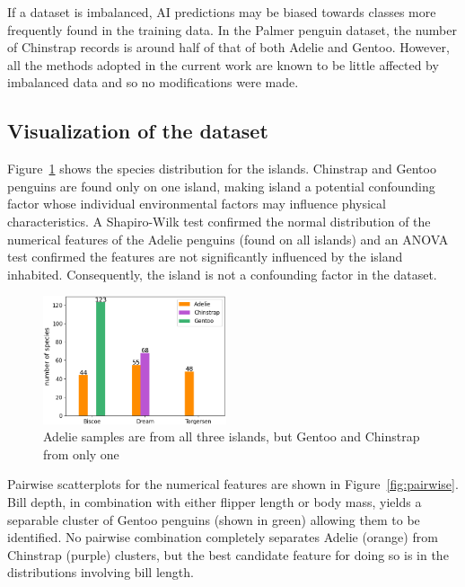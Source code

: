 \documentclass[12pt]{article}
\begin{document}
If a dataset is imbalanced, 
AI predictions may be biased towards classes more frequently found in the training data. 
In the Palmer penguin dataset, the number of Chinstrap records is around half of that of both Adelie and Gentoo.
However, all the methods adopted in the current work are known to be little affected by 
imbalanced data \cite{he2009learning} and so no modifications were made.

\subsection*{Visualization of the dataset}

Figure~\ref{fig:islands} shows the species distribution for the islands. 
Chinstrap and Gentoo penguins are found only on one island, making island a potential confounding factor whose 
individual environmental factors may influence physical characteristics. 
A Shapiro-Wilk test confirmed the normal distribution of the numerical features of the Adelie penguins (found on 
all islands) and an ANOVA test confirmed the features are not significantly influenced by the island inhabited. 
Consequently, the island is not a confounding factor in the dataset.

\begin{figure} %
  \centering
  \vspace{-1.5\baselineskip} %
  \includegraphics[width=0.48\textwidth]{islands.png} %
  \vspace{-0.5\baselineskip} %
  \caption{Adelie samples are from all three islands, but Gentoo and Chinstrap from only one}
  \vspace{-1.5\baselineskip} %
  \label{fig:islands}
\end{figure}

Pairwise scatterplots for the numerical features are shown in Figure~\ref{fig:pairwise}. 
Bill depth, in combination with either flipper length or body mass, 
yields a separable cluster of Gentoo penguins (shown in green) allowing them to be identified. 
No pairwise combination completely separates Adelie (orange) from Chinstrap (purple) clusters, 
but the best candidate feature for doing so is in the distributions involving bill length.
\end{document}
